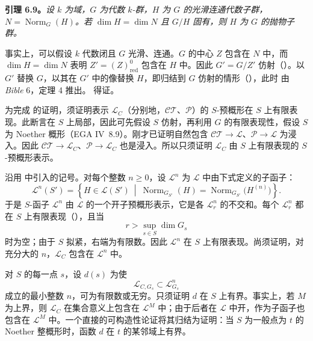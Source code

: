 \textbf{引理 6.9。}\emph{设 \(k\) 为域，\(G\) 为代数 \(k\)-群，\(H\) 为 \(G\) 的光滑连通代数子群，\(N=\operatorname{Norm}_G(H)\)。若 \(\dim H=\dim N\) 且 \(G/H\) 固有，则 \(H\) 为 \(G\) 的抛物子群。}

事实上，可以假设 \(k\) 代数闭且 \(G\) 光滑、连通。\(G\) 的中心 \(Z\) 包含在 \(N\) 中，而 \(\dim H=\dim N\) 表明 \(Z'=(Z)^0_{\mathrm{red}}\) 包含在 \(H\) 中。因此 \(G'=G/Z'\) 仿射（）。以 \(G'\) 替换 \(G\)，以其在 \(G'\) 中的像替换 \(H\)，即归结到 \(G\) 仿射的情形（），此时 由 \emph{Bible} 6，定理 4 推出。 得证。

为完成  的证明，须证明表示 \(\mathcal L_C\)（分别地，\(\mathcal{CT}\)、\(\mathcal P\)）的 \(S\)-预概形在 \(S\) 上有限表现。此断言在 \(S\) 上局部，因此可先假设 \(S\) 仿射，再利用 \(G\) 的有限表现性，假设 \(S\) 为 Noether 概形（EGA IV~8.9）。刚才已证明自然包含 \(\mathcal{CT}\to\mathcal L\)、\(\mathcal P\to\mathcal L\) 为浸入。因此 \(\mathcal{CT}\to\mathcal L_C\)、\(\mathcal P\to\mathcal L_C\) 也是浸入。所以只须证明 \(\mathcal L_C\) 由 \(S\) 上有限表现的 \(S\)-预概形表示。

沿用  中引入的记号。对每个整数 \(n\geq0\)，设 \(\mathcal L^n\) 为 \(\mathcal L\) 中由下式定义的子函子：
\[
\mathcal L^n(S')
 =\left\{H\in\mathcal L(S')\ \middle|\ 
   \operatorname{Norm}_{G_{S'}}(H)
   =\operatorname{Norm}_{G_{S'}}\bigl(H^{(n)}\bigr)\right\}.
\]
于是 \(S\)-函子 \(\mathcal L^n\) 由 \(\mathcal L\) 的一个开子预概形表示，它是各 \(\mathcal L_r^n\) 的不交和。每个 \(\mathcal L_r^n\) 都在 \(S\) 上有限表现（），且当
\[
r>\sup_{s\in S}\dim G_s
\]
时为空；由于 \(S\) 拟紧，右端为有限数。因此 \(\mathcal L^n\) 在 \(S\) 上有限表现。尚须证明，对充分大的 \(n\)，\(\mathcal L_C\) 包含在 \(\mathcal L^n\) 中。

对 \(S\) 的每一点 \(s\)，设 \(d(s)\) 为使
\[
\mathcal L_{C,G_s}\subset\mathcal L^n_{G_s}
\]
成立的最小整数 \(n\)，可为有限数或无穷。只须证明 \(d\) 在 \(S\) 上有界。事实上，若 \(M\) 为上界，则 \(\mathcal L_C\) 在集合意义上包含在 \(\mathcal L^M\) 中；由于后者在 \(\mathcal L\) 中开，作为子函子也包含在 \(\mathcal L^M\) 中。一个直接的可构造性论证将其归结为证明：当 \(S\) 为一般点为 \(t\) 的 Noether 整概形时，函数 \(d\) 在 \(t\) 的某邻域上有界。

